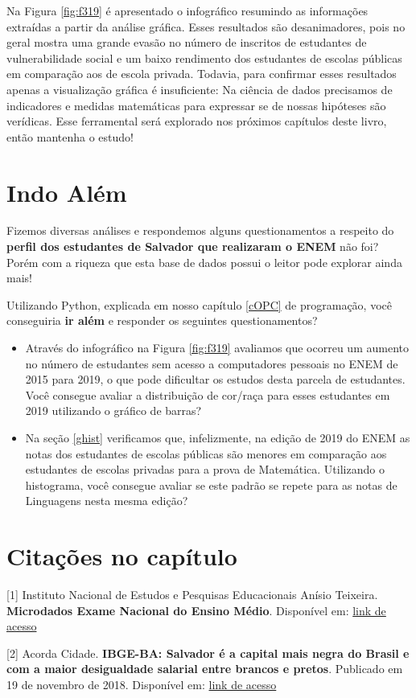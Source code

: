 \documentclass[
  portuguese,
  oneside]{book}
\begin{document}
Na Figura \ref{fig:f319} é apresentado o infográfico resumindo as informações extraídas a partir da análise gráfica. Esses resultados são desanimadores, pois no geral mostra uma grande evasão no número de inscritos de estudantes de vulnerabilidade social e um baixo rendimento dos estudantes de escolas públicas em comparação aos de escola privada. Todavia, para confirmar esses resultados apenas a visualização gráfica é insuficiente: Na ciência de dados precisamos de indicadores e medidas matemáticas para expressar se de nossas hipóteses são verídicas. Esse ferramental será explorado nos próximos capítulos deste livro, então mantenha o estudo!

\hypertarget{indo-aluxe9m}{%
\section{Indo Além}\label{indo-aluxe9m}}

Fizemos diversas análises e respondemos alguns questionamentos a respeito do \textbf{perfil dos estudantes de Salvador que realizaram o ENEM} não foi? Porém com a riqueza que esta base de dados possui o leitor pode explorar ainda mais!

Utilizando Python, explicada em nosso capítulo \ref{cOPC} de programação, você conseguiria \textbf{ir além} e responder os seguintes questionamentos?

\begin{itemize}
\item
  Através do infográfico na Figura \ref{fig:f319} avaliamos que ocorreu um aumento no número de estudantes sem acesso a computadores pessoais no ENEM de 2015 para 2019, o que pode dificultar os estudos desta parcela de estudantes. Você consegue avaliar a distribuição de cor/raça para esses estudantes em 2019 utilizando o gráfico de barras?
\item
  Na seção \ref{ghist} verificamos que, infelizmente, na edição de 2019 do ENEM as notas dos estudantes de escolas públicas são menores em comparação aos estudantes de escolas privadas para a prova de Matemática. Utilizando o histograma, você consegue avaliar se este padrão se repete para as notas de Linguagens nesta mesma edição?
\end{itemize}

\hypertarget{citauxe7uxf5es-no-capuxedtulo}{%
\section{Citações no capítulo}\label{citauxe7uxf5es-no-capuxedtulo}}

{[}1{]} Instituto Nacional de Estudos e Pesquisas Educacionais Anísio Teixeira. \textbf{Microdados Exame Nacional do Ensino Médio}. Disponível em: \href{http://inep.gov.br/microdados}{link de acesso}

{[}2{]} Acorda Cidade. \textbf{IBGE-BA: Salvador é a capital mais negra do Brasil e com a maior desigualdade salarial entre brancos e pretos}. Publicado em 19 de novembro de 2018. Disponível em: \href{https://www.acordacidade.com.br/noticias/203087/ibge-ba-salvador-a-capital-mais-negra-do-brasil-e-com-a-maior-desigualdade-salarial-entre-brancos-e-pretos.html}{link de acesso}

  
\end{document}
